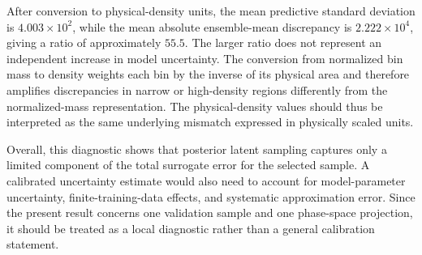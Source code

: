 After conversion to physical-density units, the mean predictive
standard deviation is \(4.003\times10^{2}\), while the mean absolute ensemble-mean discrepancy is \(2.222\times10^{4}\), giving a ratio of approximately \(55.5\). The larger ratio does not represent an independent increase in model uncertainty. The conversion from normalized bin mass to density weights each bin by the inverse of its physical area and therefore amplifies discrepancies in narrow or high-density regions differently from the normalized-mass representation. The physical-density values should thus be interpreted as the same underlying mismatch expressed in physically scaled units.

Overall, this diagnostic shows that posterior latent sampling captures only a limited component of the total surrogate error for the selected sample. A calibrated uncertainty estimate would also need to account for model-parameter uncertainty, finite-training-data effects, and systematic approximation error. Since the present result concerns one validation sample and one phase-space projection, it should be treated as a local diagnostic rather than a general calibration statement.

\begin{table}[H]
\centering
\caption{
Per-bin conditional latent spread and ensemble-mean error for validation sample \(s=3\), the \((y,\delta)\) projection, and \(R=100\) stochastic forward passes. The standard deviation and variance quantify variability induced by conditional latent sampling, whereas the absolute discrepancy is computed between the ensemble mean and the reference histogram. Physical-density values are obtained by rescaling normalized bin masses using the corresponding physical bin areas.
}
\label{tab:global_uq_histogram_summary}
\end{table}

